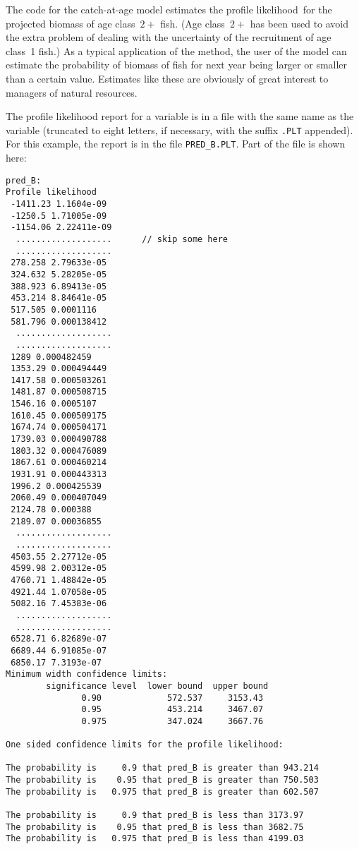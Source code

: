 \documentclass{admbmanual}
\newcommand\apl{profile likelihood}
\begin{document}
The code for the catch-at-age model estimates the \apl\ for the projected
biomass of age class~$2+$ fish. (Age class~$2+$ has been used to avoid the extra
problem of dealing with the uncertainty of the recruitment of age class~1 fish.)
As a typical application of the method, the user of the model can estimate the
probability of biomass of fish for next year being larger or smaller than a
certain value. Estimates like these are obviously of great interest to managers
of natural resources.

The profile likelihood report for a variable is in a file with the same name as
the variable (truncated to eight letters, if necessary, with the suffix
\texttt{.PLT} appended). For this example, the report is in the file
\texttt{PRED\_B.PLT}. Part of the file is shown here:
\begin{lstlisting}
pred_B:
Profile likelihood
 -1411.23 1.1604e-09
 -1250.5 1.71005e-09
 -1154.06 2.22411e-09
  ...................      // skip some here
  ...................
 278.258 2.79633e-05
 324.632 5.28205e-05
 388.923 6.89413e-05
 453.214 8.84641e-05
 517.505 0.0001116
 581.796 0.000138412
  ...................
  ...................
 1289 0.000482459
 1353.29 0.000494449
 1417.58 0.000503261
 1481.87 0.000508715
 1546.16 0.0005107
 1610.45 0.000509175
 1674.74 0.000504171
 1739.03 0.000490788
 1803.32 0.000476089
 1867.61 0.000460214
 1931.91 0.000443313
 1996.2 0.000425539
 2060.49 0.000407049
 2124.78 0.000388
 2189.07 0.00036855
  ...................
  ...................
 4503.55 2.27712e-05
 4599.98 2.00312e-05
 4760.71 1.48842e-05
 4921.44 1.07058e-05
 5082.16 7.45383e-06
  ...................
  ...................
 6528.71 6.82689e-07
 6689.44 6.91085e-07
 6850.17 7.3193e-07
Minimum width confidence limits:
        significance level  lower bound  upper bound
               0.90             572.537     3153.43
               0.95             453.214     3467.07
               0.975            347.024     3667.76

One sided confidence limits for the profile likelihood:

The probability is     0.9 that pred_B is greater than 943.214
The probability is    0.95 that pred_B is greater than 750.503
The probability is   0.975 that pred_B is greater than 602.507

The probability is     0.9 that pred_B is less than 3173.97
The probability is    0.95 that pred_B is less than 3682.75
The probability is   0.975 that pred_B is less than 4199.03
\end{lstlisting}
\end{document}
